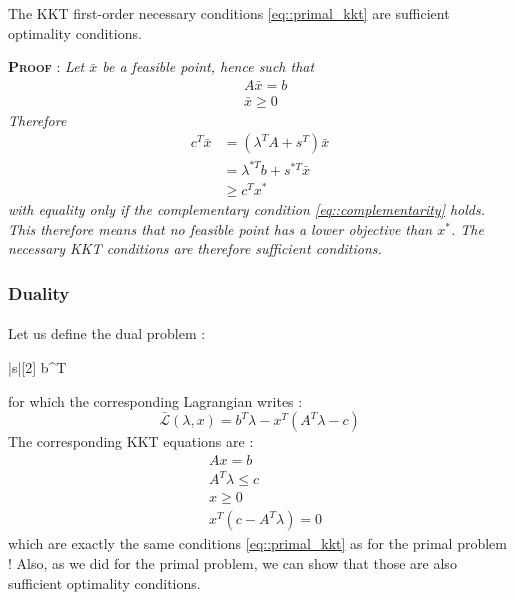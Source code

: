 \documentclass[a4paper]{article}
\begin{document}
{{{				
				{
					The KKT first-order necessary conditions \eqref{eq::primal_kkt} are sufficient optimality conditions.
				}
				\vspace{3pt}
				\begin{leftbar}
					\noindent\textbf{\textsc{Proof}} : 
					\textit{ Let $\bar{x}$ be a feasible point, hence such that 
					$$
						\begin{aligned}
							&A\bar{x} = b \\
							&\bar{x}\geq 0
						\end{aligned}
					$$
					Therefore 
					$$
						\begin{aligned}
							c^T\bar{x} &= (\lambda^T A+s^T)\bar{x}\\
									 &= \lambda^{*T} b + s^{*T}\bar{x} \\
									 &\geq c^Tx^*
						\end{aligned}
					$$
					with equality only if the complementary condition \eqref{eq::complementarity} holds. This therefore means that no feasible point has a lower objective than $x^*$. The necessary KKT conditions are therefore sufficient conditions.
					}
				\end{leftbar}
			}
			\subsubsection{Duality}
			{
				\paragraph{} Let us define the dual problem : \\
				{
					\vspace{-10pt}
					\begin{maxi}|s|[2]
						{\lambda}{b^T\lambda}
						{\label{eq::dual_lp}}{}
					\end{maxi}
				}
				\vspace{5pt}
				
				\noindent for which the corresponding Lagrangian writes : 
				\begin{equation}
					\bar{\mathcal{L}}(\lambda,x) = b^T\lambda  -x^T(A^T\lambda -c )
				\end{equation}
				The corresponding KKT equations are : 
				\begin{subequations}
					\label{eq::dual_kkt}
					\begin{align}
						&Ax = b \\
						&A^T\lambda \leq c \\
						& x\geq 0 \\
						& x^T(c-A^T\lambda) = 0
					\end{align}
				\end{subequations}
				which are exactly the same conditions \eqref{eq::primal_kkt} as for the primal problem ! Also, as we did for the primal problem, we can show that those are also sufficient optimality conditions. 		
				
}}}
\end{document}
